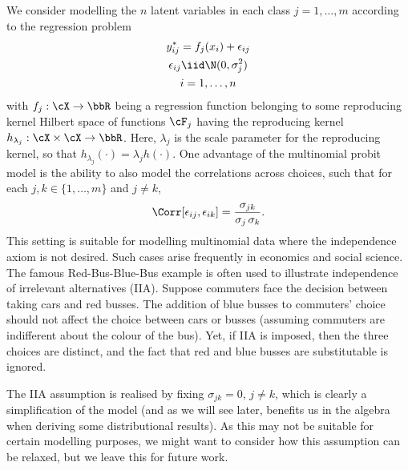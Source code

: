 \documentclass[]{article}
\begin{document}
We consider modelling the $n$ latent variables in each class $j=1,\dots,m$ according to the regression problem
\begin{equation}\label{eq:multinomial-latent}
  \begin{gathered}
    y_{ij}^* = f_j(x_i) + \epsilon_{ij} \\
    \epsilon_{ij} \iid \N(0, \sigma_j^2) \\
    i = 1,\dots,n
  \end{gathered}
\end{equation}
with $f_j:\cX \to \bbR$ being a regression function belonging to some reproducing kernel Hilbert space of functions $\cF_j$ having the reproducing kernel $h_{\lambda_j}: \cX \times \cX \to \bbR$. Here, $\lambda_j$ is the scale parameter for the reproducing kernel, so that $h_{\lambda_j}(\cdot) = \lambda_j h(\cdot)$. One advantage of the multinomial probit model is the ability to also model the correlations across choices, such that for each $j,k \in \{1,\dots,m\}$ and $j \neq k$,
\[
  \Corr[\epsilon_{ij}, \epsilon_{ik}] = \frac{\sigma_{jk}}{\sigma_j \, \sigma_k}.
\]
This setting is suitable for modelling multinomial data where the independence axiom is not desired. Such cases arise frequently in economics and social science. The famous Red-Bus-Blue-Bus example is often used to illustrate independence of irrelevant alternatives (IIA). Suppose commuters face the decision between taking cars and red busses. The addition of blue busses to commuters' choice should not affect the choice between cars or busses (assuming commuters are indifferent about the colour of the bus). Yet, if IIA is imposed, then the three choices are distinct, and the fact that red and blue busses are substitutable is ignored.

The IIA assumption is realised by fixing $\sigma_{jk} = 0$, $j \neq k$, which is clearly a simplification of the model (and as we will see later, benefits us in the algebra when deriving some distributional results). As this may not be suitable for certain modelling purposes, we might want to consider how this assumption can be relaxed, but we leave this for future work. 
\end{document}

